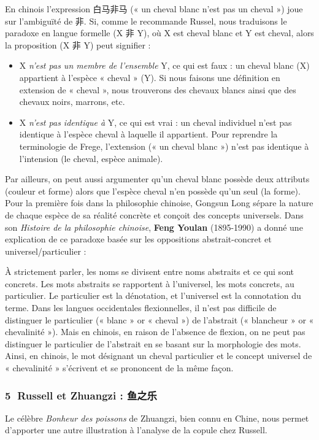 En chinois l’expression 白马非马 (« un cheval blanc n’est pas un cheval ») joue sur l’ambiguïté de 非. Si, comme le recommande Russel, nous traduisons le paradoxe en langue formelle (X 非 Y), où X est cheval blanc et Y est cheval, alors la proposition (X 非 Y) peut signifier :
\begin{itemize}
\item X \textit{n’est pas un membre de l’ensemble} Y, ce qui est faux : un cheval blanc (X) appartient à l’espèce « cheval » (Y). Si nous faisons une définition en extension de « cheval », nous trouverons des chevaux blancs ainsi que des chevaux noirs, marrons, etc.
\item X \textit{n’est pas identique à} Y, ce qui est vrai : un cheval individuel n’est pas identique à l’espèce cheval à laquelle il appartient. Pour reprendre la terminologie de Frege, l’extension (« un cheval blanc ») n’est pas identique à l’intension (le cheval, espèce animale).
\end{itemize}
Par ailleurs, on peut aussi argumenter qu’un cheval blanc possède deux attributs (couleur et forme) alors que l’espèce cheval n’en possède qu’un seul (la forme). Pour la première fois dans la philosophie chinoise, Gongsun Long sépare la nature de chaque espèce de sa réalité concrète et conçoit des concepts universels. Dans son \textit{Histoire de la philosophie chinoise}, \textbf{Feng Youlan} (1895-1990) a donné une explication de ce paradoxe basée sur les oppositions abstrait-concret et universel/particulier :

\begin{lecture}{}
À strictement parler, les noms se divisent entre noms abstraits et ce qui sont concrets. Les mots abstraits se rapportent à l’universel, les mots concrets, au particulier. Le particulier est la dénotation, et l’universel est la connotation du terme. Dans les langues occidentales flexionnelles, il n’est pas difficile de distinguer le particulier (« blanc » or « cheval ») de l’abstrait (« blancheur » or « chevalinité »). Mais en chinois, en raison de l’absence de flexion, on ne peut pas distinguer le particulier de l’abstrait en se basant sur la morphologie des mots. Ainsi, en chinois, le mot désignant un cheval particulier et le concept universel de « chevalinité » s’écrivent et se prononcent de la même façon.
\end{lecture}

\subsubsection*{\textcircled{\scriptsize 5} Russell et Zhuangzi : 鱼之乐}
Le célèbre \textit{Bonheur des poissons} de Zhuangzi, bien connu en Chine, nous permet d’apporter une autre illustration à l’analyse de la copule chez Russell.

